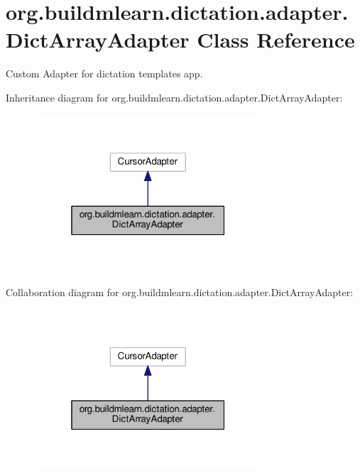 \hypertarget{classorg_1_1buildmlearn_1_1dictation_1_1adapter_1_1DictArrayAdapter}{}\section{org.\+buildmlearn.\+dictation.\+adapter.\+Dict\+Array\+Adapter Class Reference}
\label{classorg_1_1buildmlearn_1_1dictation_1_1adapter_1_1DictArrayAdapter}


Custom Adapter for dictation template\textquotesingle{}s app.  




Inheritance diagram for org.\+buildmlearn.\+dictation.\+adapter.\+Dict\+Array\+Adapter\+:
\nopagebreak
\begin{figure}[H]
\begin{center}
\leavevmode
\includegraphics[width=241pt]{classorg_1_1buildmlearn_1_1dictation_1_1adapter_1_1DictArrayAdapter__inherit__graph}
\end{center}
\end{figure}


Collaboration diagram for org.\+buildmlearn.\+dictation.\+adapter.\+Dict\+Array\+Adapter\+:
\nopagebreak
\begin{figure}[H]
\begin{center}
\leavevmode
\includegraphics[width=241pt]{classorg_1_1buildmlearn_1_1dictation_1_1adapter_1_1DictArrayAdapter__coll__graph}
\end{center}
\end{figure}
